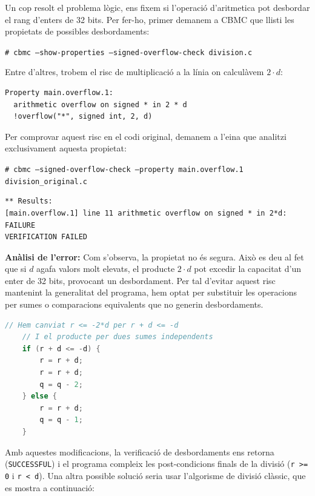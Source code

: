 \documentclass[12pt,a4paper]{article}
\begin{document}
Un cop resolt el problema lògic, ens fixem si l'operació d'aritmetica pot desbordar el rang d'enters de 32 bits. Per fer-ho, primer demanem a CBMC que llisti les propietats de possibles desbordaments:

\begin{tcolorbox}[colback=black!85, coltext=white]
\texttt{\# cbmc --show-properties --signed-overflow-check division.c}
\end{tcolorbox}

Entre d'altres, trobem el risc de multiplicació a la línia on calculàvem $2 \cdot d$:
\begin{verbatim}
Property main.overflow.1:
  arithmetic overflow on signed * in 2 * d
  !overflow("*", signed int, 2, d)
\end{verbatim}

Per comprovar aquest risc en el codi original, demanem a l'eina que analitzi exclusivament aquesta propietat:
\begin{tcolorbox}[colback=black!85, coltext=white]
\texttt{\# cbmc --signed-overflow-check --property main.overflow.1 division\_original.c}
\end{tcolorbox}
\begin{verbatim}
** Results:
[main.overflow.1] line 11 arithmetic overflow on signed * in 2*d: FAILURE
VERIFICATION FAILED
\end{verbatim}

\textbf{Anàlisi de l'error:} Com s'observa, la propietat no és segura. Això es deu al fet que si $d$ agafa valors molt elevats, el producte $2 \cdot d$ pot excedir la capacitat d'un enter de 32 bits, provocant un desbordament. Per tal d'evitar aquest risc mantenint la generalitat del programa, hem optat per substituir les operacions per sumes o comparacions equivalents que no generin desbordaments.

\begin{lstlisting}[language=C]
    // Hem canviat r <= -2*d per r + d <= -d
    // I el producte per dues sumes independents
    if (r + d <= -d) { 
        r = r + d;
        r = r + d; 
        q = q - 2;
    } else { 
        r = r + d; 
        q = q - 1;
    }
\end{lstlisting}

Amb aquestes modificacions, la verificació de desbordaments ens retorna (\texttt{SUCCESSFUL}) i el programa compleix les post-condicions finals de la divisió (\texttt{r >= 0} i \texttt{r < d}).
Una altra possible solució seria usar l'algorisme de divisió clàssic, que es mostra a continuació:
\end{document}
